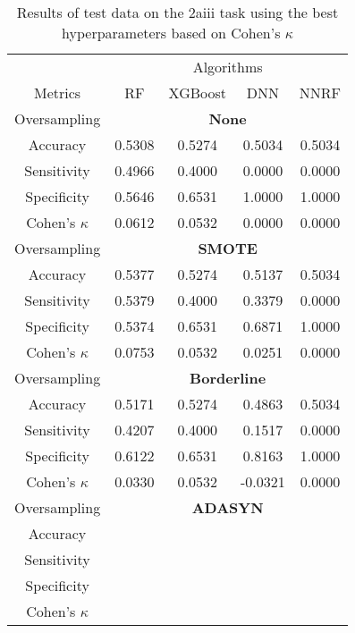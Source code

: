 \begin{table}[!htb]
\centering
\caption{Results of test data on the 2aiii task using the best hyperparameters based on Cohen's $\kappa$}
\label{tab:{task}_test_results}
\begin{tabular}{c | c c c c}
\hline
 & \multicolumn{4}{c}{Algorithms}\\ 
Metrics &RF & XGBoost & DNN & NNRF\\ 
\hline
Oversampling &\multicolumn{4}{|c}{\textbf{None}}\\ 
\hline
Accuracy & 0.5308 & 0.5274 & 0.5034 & 0.5034\\ 
Sensitivity & 0.4966 & 0.4000 & 0.0000 & 0.0000\\ 
Specificity & 0.5646 & 0.6531 & 1.0000 & 1.0000\\ 
Cohen's $\kappa$ & 0.0612 & 0.0532 & 0.0000 & 0.0000\\ 
\hline
Oversampling &\multicolumn{4}{|c}{\textbf{SMOTE}}\\ 
\hline
Accuracy & 0.5377 & 0.5274 & 0.5137 & 0.5034\\ 
Sensitivity & 0.5379 & 0.4000 & 0.3379 & 0.0000\\ 
Specificity & 0.5374 & 0.6531 & 0.6871 & 1.0000\\ 
Cohen's $\kappa$ & 0.0753 & 0.0532 & 0.0251 & 0.0000\\ 
\hline
Oversampling &\multicolumn{4}{|c}{\textbf{Borderline}}\\ 
\hline
Accuracy & 0.5171 & 0.5274 & 0.4863 & 0.5034\\ 
Sensitivity & 0.4207 & 0.4000 & 0.1517 & 0.0000\\ 
Specificity & 0.6122 & 0.6531 & 0.8163 & 1.0000\\ 
Cohen's $\kappa$ & 0.0330 & 0.0532 & -0.0321 & 0.0000\\ 
\hline
Oversampling &\multicolumn{4}{|c}{\textbf{ADASYN}}\\ 
\hline
Accuracy &  &  &  & \\ 
Sensitivity &  &  &  & \\ 
Specificity &  &  &  & \\ 
Cohen's $\kappa$ &  &  &  & \\ 
\hline
\end{tabular}
\end{table}

